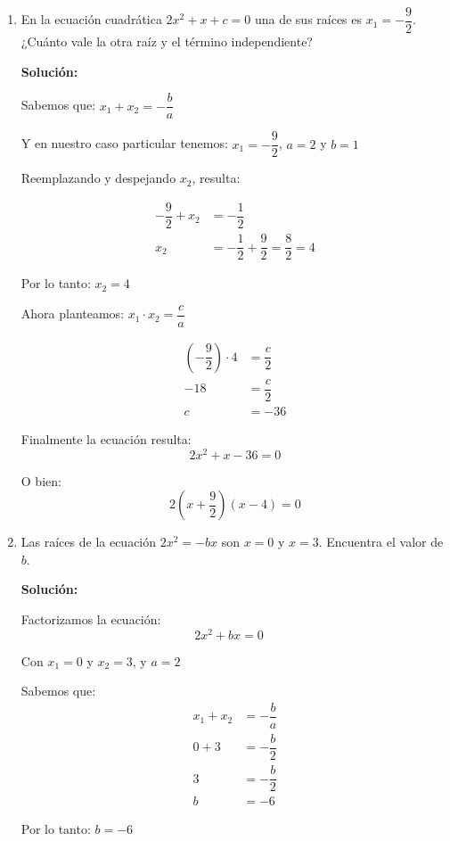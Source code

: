 \documentclass[12pt]{article}
\newcommand{\solucion}{%
    \vspace{0.8em}%
    \textbf{Solución:}%
}
\begin{document}
\begin{enumerate}[label=\alph*)]
\item En la ecuación cuadrática $2x^2 + x + c = 0$ una de sus raíces es $x_1 = -\dfrac{9}{2}$. ¿Cuánto vale la otra raíz y el término independiente?

\solucion

Sabemos que: $x_1 + x_2 = -\dfrac{b}{a}$

Y en nuestro caso particular tenemos: $x_1 = -\dfrac{9}{2}$, $a = 2$ y $b = 1$

Reemplazando y despejando $x_2$, resulta:

\begin{align*}
-\dfrac{9}{2} + x_2 &= -\dfrac{1}{2} \\[0.3em]
x_2 &= -\dfrac{1}{2} + \dfrac{9}{2} = \dfrac{8}{2} = 4
\end{align*}

Por lo tanto: $\boxed{x_2 = 4}$

Ahora planteamos: $x_1 \cdot x_2 = \dfrac{c}{a}$

\begin{align*}
\left(-\dfrac{9}{2}\right) \cdot 4 &= \dfrac{c}{2} \\[0.3em]
-18 &= \dfrac{c}{2} \\[0.3em]
c &= -36
\end{align*}

Finalmente la ecuación resulta:
\[
2x^2 + x - 36 = 0
\]

O bien:
\[
2\left(x + \dfrac{9}{2}\right)(x - 4) = 0
\]

\newpage
\item Las raíces de la ecuación $2x^2 = -bx$ son $x = 0$ y $x = 3$. Encuentra el valor de $b$.

\solucion

Factorizamos la ecuación:
\[
2x^2 + bx = 0 \quad
\]

Con $x_1 = 0$ y $x_2 = 3$, y $a = 2$

Sabemos que:
\begin{align*}
x_1 + x_2 &= -\dfrac{b}{a} \\[0.3em]
0 + 3 &= -\dfrac{b}{2} \\[0.3em]
3 &= -\dfrac{b}{2} \\[0.3em]
b &= -6
\end{align*}

Por lo tanto: $\boxed{b = -6}$


\end{enumerate}
\end{document}

